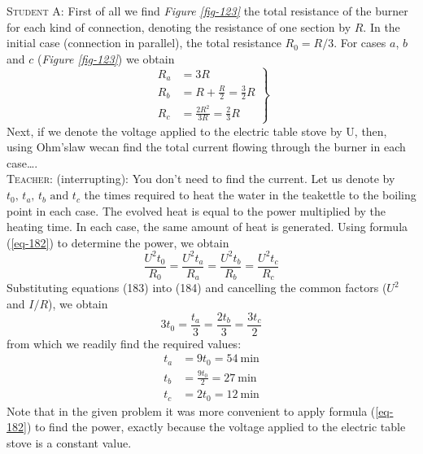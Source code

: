 \documentclass[a4paper,sfsidenotes]{tufte-book}
\begin{document}
\textsc{Student A:} First of all we find \emph{Figure \ref{fig-123}} the total resistance of the burner for each kind of connection, denoting the resistance of one section by $R$. In the initial case (connection in parallel), the total resistance $R_{0}=R/3$. For cases $a$, $b$ and $c$ (\emph{Figure \ref{fig-123}}) we obtain
\begin{equation}%
\left.
\begin{split}
R_{a} & = 3R \\
R_{b} & = R+ \frac{R}{2}=\frac{3}{2} R \\
R_{c} & =\frac{2R^{2}}{3R} = \frac{2}{3} R
\label{eq-183}
\end{split}
\right\}
\end{equation}
Next, if we denote the voltage applied to the electric table stove by U, then, using Ohm'slaw wecan find the total current flowing through the burner in each case\ldots{}.
\\
\textsc{Teacher:} (interrupting): You don't need to find the current. Let us denote by $t_{0}, \,t_{a},\, t_{b}\,\, \text{and} \,\, t_{c}$ the times required to heat the water in the teakettle to the boiling point in each  case. The evolved heat is equal to the power multiplied by the heating time. In each case, the same amount of heat is generated. Using formula (\ref{eq-182}) to determine the power, we obtain
\begin{equation}%
\frac{U^{2}t_{0}}{R_{0}} =  \frac{U^{2}t_{a}}{R_{a}} =\frac{U^{2} t_{b}}{R_{b}} = \frac{U^{2}t_{c}}{R_{c}}
\label{184}
\end{equation}
Substituting equations (183) into (184) and cancelling the common factors ($U^{2}$ and $I/R$), we obtain
\begin{equation*}%
3t_{0} = \frac{t_{a}}{3} = \frac{2t_{b}}{3} = \frac{3t_{c}}{2}
\end{equation*}
from which we readily find the required values: 
\begin{align*}%
t_{a} & = 9 t_{0}= \SI{54}{\minute}\\
t_{b} & =\frac{9t_{0}}{2}= \SI{27}{\minute} \\
t_{c} & =2t_{0}  = \SI{12}{\minute}
\end{align*}
Note that in the given problem it was more convenient to apply formula (\ref{eq-182}) to find the power, exactly because the voltage applied to the electric table stove is a constant value. 
\end{document}
